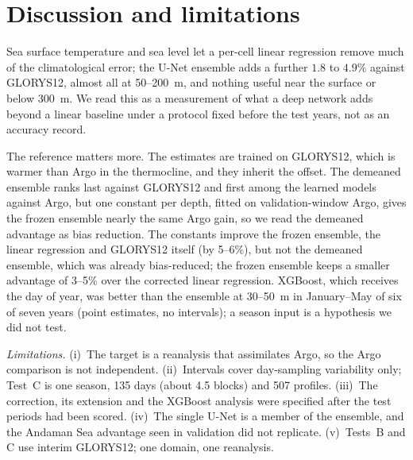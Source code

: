 
\section{Discussion and limitations}
\label{sec:discussion}
Sea surface temperature and sea level let a per-cell linear regression remove much of the climatological error; the U-Net ensemble adds a further $1.8$ to $4.9\%$ against GLORYS12, almost all at 50--200~m, and nothing useful near the surface or below 300~m. We read this as a measurement of what a deep network adds beyond a linear baseline under a protocol fixed before the test years, not as an accuracy record.

The reference matters more. The estimates are trained on GLORYS12, which is warmer than Argo in the thermocline, and they inherit the offset. The demeaned ensemble ranks last against GLORYS12 and first among the learned models against Argo, but one constant per depth, fitted on validation-window Argo, gives the frozen ensemble nearly the same Argo gain, so we read the demeaned advantage as bias reduction. The constants improve the frozen ensemble, the linear regression and GLORYS12 itself (by 5--6\%), but not the demeaned ensemble, which was already bias-reduced; the frozen ensemble keeps a smaller advantage of 3--5\% over the corrected linear regression. XGBoost, which receives the day of year, was better than the ensemble at 30--50~m in January--May of six of seven years (point estimates, no intervals); a season input is a hypothesis we did not test.

\emph{Limitations.} (i)~The target is a reanalysis that assimilates Argo, so the Argo comparison is not independent. (ii)~Intervals cover day-sampling variability only; Test~C is one season, 135 days (about 4.5 blocks) and 507 profiles. (iii)~The correction, its extension and the XGBoost analysis were specified after the test periods had been scored. (iv)~The single U-Net is a member of the ensemble, and the Andaman Sea advantage seen in validation did not replicate. (v)~Tests~B and C use interim GLORYS12; one domain, one reanalysis.
